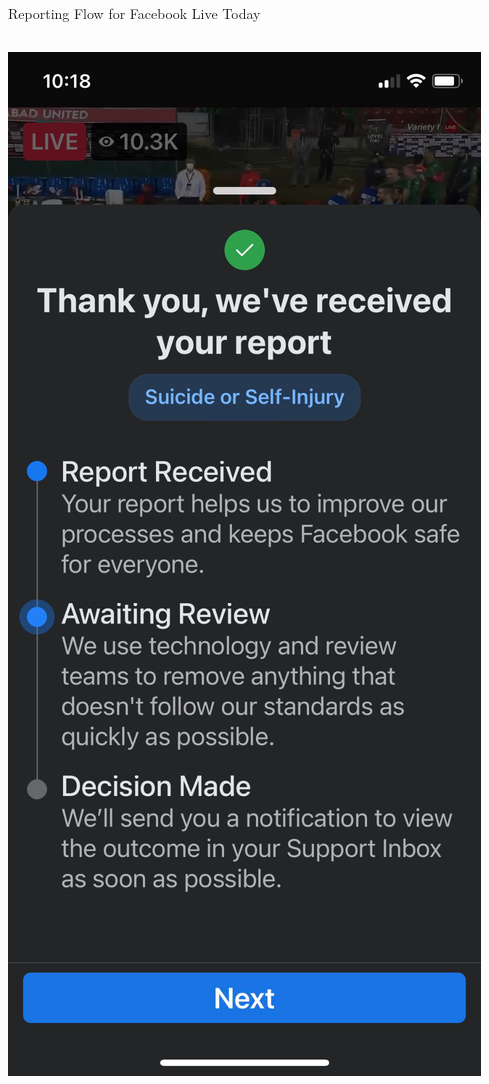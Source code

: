 \documentclass[nobackground,dvipsnames,table]{beamer}
\begin{document}
\begin{frame}{Reporting Flow for Facebook Live Today}
\begin{columns}
            \includegraphics[width=\textwidth]{facebook-live-current-reporting-flow-2}

\end{columns}
\end{frame}
\end{document}
